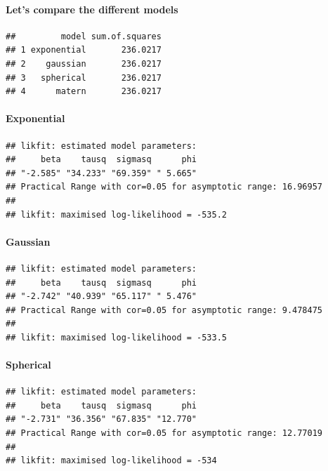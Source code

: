 \documentclass[
]{article}
\begin{document}
\hypertarget{lets-compare-the-different-models}{%
\paragraph{Let's compare the different
models}\label{lets-compare-the-different-models}}

\begin{verbatim}
##         model sum.of.squares
## 1 exponential       236.0217
## 2    gaussian       236.0217
## 3   spherical       236.0217
## 4      matern       236.0217
\end{verbatim}

\hypertarget{exponential-1}{%
\paragraph{Exponential}\label{exponential-1}}

\begin{verbatim}
## likfit: estimated model parameters:
##     beta    tausq  sigmasq      phi 
## "-2.585" "34.233" "69.359" " 5.665" 
## Practical Range with cor=0.05 for asymptotic range: 16.96957
## 
## likfit: maximised log-likelihood = -535.2
\end{verbatim}

\hypertarget{gaussian-1}{%
\paragraph{Gaussian}\label{gaussian-1}}

\begin{verbatim}
## likfit: estimated model parameters:
##     beta    tausq  sigmasq      phi 
## "-2.742" "40.939" "65.117" " 5.476" 
## Practical Range with cor=0.05 for asymptotic range: 9.478475
## 
## likfit: maximised log-likelihood = -533.5
\end{verbatim}

\hypertarget{spherical-1}{%
\paragraph{Spherical}\label{spherical-1}}

\begin{verbatim}
## likfit: estimated model parameters:
##     beta    tausq  sigmasq      phi 
## "-2.731" "36.356" "67.835" "12.770" 
## Practical Range with cor=0.05 for asymptotic range: 12.77019
## 
## likfit: maximised log-likelihood = -534
\end{verbatim}
\end{document}
